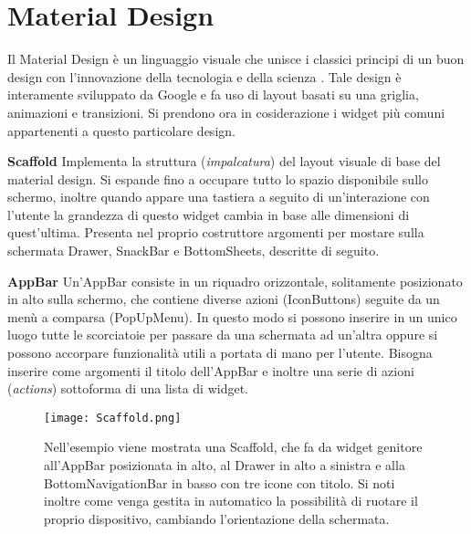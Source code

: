 	\section{Material Design}
	Il Material Design è un linguaggio visuale che unisce i classici principi di
	un buon design con l'innovazione della tecnologia e della scienza 
	\cite{2}. \newline
	Tale design è interamente sviluppato da Google e fa uso di layout basati su
	una griglia, animazioni e transizioni. Si prendono ora in cosiderazione i
	widget più comuni appartenenti a questo particolare design.
	\begin{trivlist}
		\item \textbf{Scaffold} \newline
		Implementa la struttura (\textit{impalcatura}) del layout visuale di
		base del material design. Si espande fino a occupare tutto lo spazio
		disponibile sullo schermo, inoltre quando appare una tastiera a seguito
		di un'interazione con l'utente la grandezza di questo widget cambia in
		base alle dimensioni di quest'ultima. Presenta nel proprio costruttore
		argomenti per mostare sulla schermata Drawer, SnackBar e BottomSheets,
		descritte di seguito. 
		\item \textbf{AppBar} \newline
		Un'AppBar consiste in un riquadro orizzontale, solitamente posizionato in
		alto sulla schermo, che contiene diverse azioni (IconButtons) seguite da
		un menù a comparsa (PopUpMenu). In questo modo si possono inserire in un
		unico luogo tutte le scorciatoie per passare da una schermata ad
		un'altra oppure si possono accorpare funzionalità utili a portata di
		mano per l'utente. Bisogna inserire come argomenti il titolo dell'AppBar
		e inoltre una serie di azioni (\textit{actions}) sottoforma di una lista
		di widget. 
		\begin{figure}
			\centering
			\texttt{[image: Scaffold.png]}			
			\caption{Nell'esempio viene mostrata una Scaffold, che fa da widget
			genitore all'AppBar posizionata in alto, al Drawer in alto a
			sinistra e alla BottomNavigationBar in basso con tre icone con
			titolo. Si noti inoltre come venga gestita in automatico la
			possibilità di ruotare il proprio dispositivo, cambiando
			l'orientazione della schermata.}
		\end{figure}

\end{trivlist}
